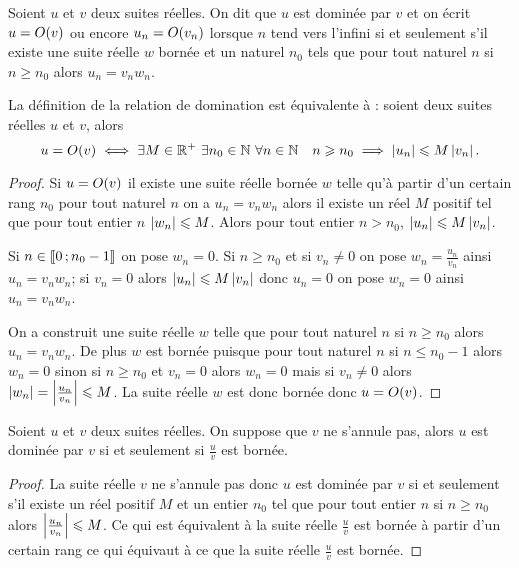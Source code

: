 \begin{defdef}
  Soient $u$ et $v$ deux suites réelles. On dit que $u$ est dominée par $v$ et on écrit $u=O\mathopen{}\left(v\right)$ ou encore $u_n=O\mathopen{}\left(v_n\right)$ lorsque $n$ tend vers l'infini si et seulement s'il existe une suite réelle $w$ bornée et un naturel $n_0$ tels que pour tout naturel $n$ si $n \geqslant n_0$ alors $u_n = v_n w_n$. 
\end{defdef}
\begin{prop}
  La définition de la relation de domination est équivalente à : soient deux suites réelles $u$ et $v$, alors
  \begin{equation}
    u=O\mathopen{}\left(v\right) \iff \exists M \in \mathbb{R}^{+} \ \exists n_0 \in \mathbb{N} \ \forall n \in \mathbb{N} \quad n \geqslant n_0 \implies \left\lvert u_n\right\rvert \leqslant M \left\lvert v_n\right\rvert.
  \end{equation}
\end{prop}
\begin{proof}
  Si $u=O\mathopen{}\left(v\right)$ il existe une suite réelle bornée $w$ telle qu'à partir d'un certain rang $n_0$ pour tout naturel $n$ on a $u_n=v_n w_n$ alors il existe un réel $M$ positif tel que pour tout entier $n$ $\left\lvert w_n\right\rvert \leqslant M$. Alors pour tout entier $n > n_0$, $\left\lvert u_n\right\rvert\leqslant M \left\lvert v_n\right\rvert$.

Si $n \in \mathopen{\llbracket}0\mathclose{}\mathpunct{};n_0-1\mathclose{\rrbracket}$ on pose $w_n=0$. Si $n \geqslant n_0$ et si $v_n \neq 0$ on pose $w_n = \frac{u_n}{v_n}$ ainsi $u_n = v_n w_n$; si $v_n = 0$ alors $\left\lvert u_n\right\rvert \leqslant M \left\lvert v_n\right\rvert$ donc $u_n=0$ on pose $w_n=0$ ainsi $u_n=v_n w_n$.

On a construit une suite réelle $w$ telle que pour tout naturel $n$ si $n \geqslant n_0$ alors $u_n = v_n w_n$. De plus $w$ est bornée puisque pour tout naturel $n$ si $n \leqslant n_0 -1$ alors $w_n=0$ sinon si $n \geqslant n_0$ et $v_n=0$ alors $w_n=0$ mais si $v_n \neq 0$ alors $\left\lvert w_n\right\rvert=\left\lvert\frac{u_n}{v_n}\right\rvert \leqslant M$. La suite réelle $w$ est donc bornée donc $u=O\mathopen{}\left(v\right)$.
\end{proof}
\begin{prop}
  Soient $u$ et $v$ deux suites réelles. On suppose que $v$ ne s'annule pas, alors $u$ est dominée par $v$ si et seulement si $\frac{u}{v}$ est bornée.
\end{prop}
\begin{proof}
  La suite réelle $v$ ne s'annule pas donc $u$ est dominée par $v$ si et seulement s'il existe un réel positif $M$ et un entier $n_0$ tel que pour tout entier $n$ si $n \geqslant n_0$ alors $\left\lvert\frac{u_n}{v_n}\right\rvert \leqslant M$. Ce qui est équivalent à la suite réelle $\frac{u}{v}$ est bornée à partir d'un certain rang ce qui équivaut à  ce que la suite réelle $\frac{u}{v}$ est bornée.
\end{proof}

